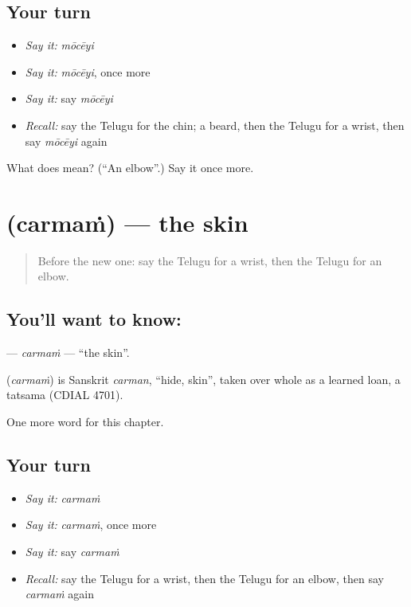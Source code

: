 \subsection*{Your turn}
\begin{itemize}
\raggedright
  \item \emph{Say it:} \emph{mōcēyi}
  \item \emph{Say it:} \emph{mōcēyi}, once more
  \item \emph{Say it:} say \emph{mōcēyi}
  \item \emph{Recall:} say the Telugu for the chin; a beard, then the Telugu for a wrist, then say \emph{mōcēyi} again
\end{itemize}

\begin{tcolorbox}[breakable,colback=teal!4,colframe=teal!35!black,title={Before you move on}]
What does  mean? (\textquotedblleft{}An elbow\textquotedblright{}.) Say it once more.
\end{tcolorbox}
\section[\texorpdfstring{\te{చర్మం} (carmaṁ)}{చర్మం (carmaṁ)}]{ (carmaṁ) — the skin}

\label{lesson:TE-C128-carmam}



\begin{quote}
Before the new one: say the Telugu for a wrist, then the Telugu for an elbow.
\end{quote}

\subsection*{You'll want to know: }
\textbf{} — \emph{carmaṁ} — \textquotedblleft{}the skin\textquotedblright{}.

\begin{cousinweb}
\textbf{} (\emph{carmaṁ}) is Sanskrit \emph{carman}, \textquotedblleft{}hide, skin\textquotedblright{}, taken over whole as a learned loan, a tatsama (CDIAL 4701).
\end{cousinweb}

\begin{grammarlens}[title={What you've built}]
One more word for this chapter.
\end{grammarlens}

\subsection*{Your turn}
\begin{itemize}
\raggedright
  \item \emph{Say it:} \emph{carmaṁ}
  \item \emph{Say it:} \emph{carmaṁ}, once more
  \item \emph{Say it:} say \emph{carmaṁ}
  \item \emph{Recall:} say the Telugu for a wrist, then the Telugu for an elbow, then say \emph{carmaṁ} again
\end{itemize}

